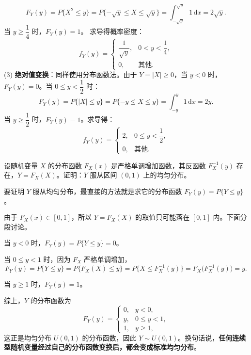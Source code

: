 \documentclass[lang=cn,11pt]{elegantbook}
\begin{document}
\begin{solution}
\[
F_Y(y) = P\{X^2 \le y\} = P\{-\sqrt{y} \le X \le \sqrt{y}\} = \int_{-\sqrt{y}}^{\sqrt{y}} 1 \, \mathrm{d}x = 2\sqrt{y}.
\]
当 $y \ge \dfrac{1}{4}$ 时，$F_Y(y) = 1$。
求导得概率密度：
\[
f_Y(y) = \begin{cases}
\dfrac{1}{\sqrt{y}}, & 0 < y < \dfrac{1}{4}, \\
0, & \text{其他}.
\end{cases}
\]
(3) \textbf{绝对值变换}：同样使用分布函数法。由于 $Y = |X| \ge 0$，当 $y < 0$ 时，$F_Y(y) = 0$。当 $0 \le y < \dfrac{1}{2}$ 时：
\[
F_Y(y) = P\{|X| \le y\} = P\{-y \le X \le y\} = \int_{-y}^{y} 1 \, \mathrm{d}x = 2y.
\]
当 $y \ge \dfrac{1}{2}$ 时，$F_Y(y) = 1$。求导得：
\[
f_Y(y) = \begin{cases}
2, & 0 \le y < \dfrac{1}{2}, \\
0, & \text{其他}.
\end{cases}
\]
\end{solution}


\begin{exercise}[概率积分变换] \label{exer:2-20}
设随机变量 $X$ 的分布函数 $F_X(x)$ 是严格单调增加函数，其反函数 $F_X^{-1}(y)$ 存在，$Y = F_X(X)$。证明：$Y$ 服从区间 $(0,1)$ 上的均匀分布。
\end{exercise}

\begin{solution}
要证明 $Y$ 服从均匀分布，最直接的方法就是求它的分布函数 $F_Y(y)=P\{Y\le y\}$。

由于 $F_X(x)\in[0,1]$，所以 $Y=F_X(X)$ 的取值只可能落在 $[0,1]$ 内。下面分段讨论。

当 $y < 0$ 时，$F_Y(y) = P\{Y \le y\} = 0$。

当 $0 \le y < 1$ 时，因为 $F_X$ 严格单调增加，
\[
F_Y(y)=P\{Y\le y\}=P\{F_X(X)\le y\}=P\{X\le F_X^{-1}(y)\}=F_X\!\bigl(F_X^{-1}(y)\bigr)=y.
\]

当 $y \ge 1$ 时，$F_Y(y) = 1$。

综上，$Y$ 的分布函数为
\[
F_Y(y) = \begin{cases}
0, & y < 0, \\
y, & 0 \le y < 1, \\
1, & y \ge 1,
\end{cases}
\]
这正是均匀分布 $U(0,1)$ 的分布函数，因此 \(Y\sim U(0,1)\)。换句话说，\textbf{任何连续型随机变量经过自己的分布函数变换后，都会变成标准均匀分布}。
\end{solution}
\end{document}
